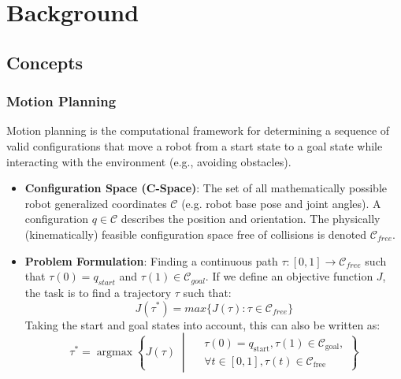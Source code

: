 \section{Background}\label{background}

\subsection{Concepts}\label{theory-concepts}

\subsubsection{Motion Planning}\label{motion-planning}
Motion planning is the computational framework for determining a
sequence of valid configurations that move a robot from a start state to
a goal state while interacting with the environment (e.g., avoiding
obstacles). 
\begin{itemize}
    \item \textbf{Configuration Space (C-Space)}: The set of all
mathematically possible robot generalized coordinates \(\mathcal{C}\) (e.g. robot base pose and joint angles). A configuration \(q \in \mathcal{C}\) describes the position and
orientation. The physically (kinematically) feasible configuration space free of collisions is denoted $\mathcal{C}_{free}$.
    \item \textbf{Problem Formulation}: Finding a continuous path
\(\tau: [0, 1] \rightarrow \mathcal{C}_{free}\) such that
\(\tau(0) = q_{start}\) and \(\tau(1) \in \mathcal{C}_{goal}\). If we define an objective function $J$, the task is to find a trajectory $\tau$ such that:
\[
J(\tau^*) = max\{J(\tau): \tau \in \mathcal{C}_{free}\}
\]
Taking the start and goal states into account, this can also be written as:
\[
\tau^* = \operatorname{argmax} \left\{ J(\tau) \;\middle|\; 
\begin{aligned} 
&\tau(0) = q_{\text{start}}, \tau(1) \in \mathcal{C}_{\text{goal}}, \\ 
&\forall t \in [0,1], \tau(t) \in \mathcal{C}_{\text{free}} 
\end{aligned} 
\right\}
\]
\end{itemize}


